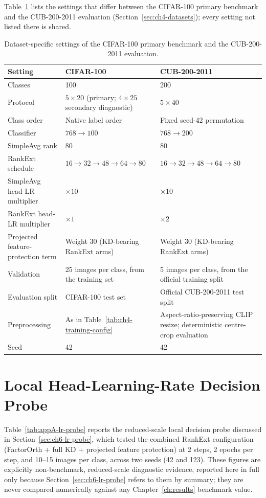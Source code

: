 Table~\ref{tab:appA-datasets} lists the settings that differ between the
CIFAR-100 primary benchmark and the CUB-200-2011 evaluation
(Section~\ref{sec:ch4-datasets}); every setting not listed there is shared.

\begin{table}[htbp]
\centering
\begin{tabularx}{\textwidth}{@{}l X X@{}}
\toprule
\textbf{Setting} & \textbf{CIFAR-100} & \textbf{CUB-200-2011} \\
\midrule
Classes & 100 & 200 \\
Protocol & $5\times20$ (primary; $4\times25$ secondary diagnostic) & $5\times40$ \\
Class order & Native label order & Fixed seed-42 permutation \\
Classifier & $768\to100$ & $768\to200$ \\
SimpleAvg rank & 80 & 80 \\
RankExt schedule & $16{\to}32{\to}48{\to}64{\to}80$ & $16{\to}32{\to}48{\to}64{\to}80$ \\
SimpleAvg head-LR multiplier & $\times10$ & $\times10$ \\
RankExt head-LR multiplier & $\times1$ & $\times2$ \\
Projected feature-protection term & Weight 30 (KD-bearing RankExt arms) & Weight 30 (KD-bearing RankExt arms) \\
Validation & 25 images per class, from the training set & 5 images per class, from the official training split \\
Evaluation split & CIFAR-100 test set & Official CUB-200-2011 test split \\
Preprocessing & As in Table~\ref{tab:ch4-training-config} & Aspect-ratio-preserving CLIP resize; deterministic centre-crop evaluation \\
Seed & 42 & 42 \\
\bottomrule
\end{tabularx}
\caption[Dataset-specific settings]{Dataset-specific settings of the
CIFAR-100 primary benchmark and the CUB-200-2011 evaluation.}
\label{tab:appA-datasets}
\end{table}

\section{Local Head-Learning-Rate Decision Probe}
\label{sec:appA-lr-probe}

Table~\ref{tab:appA-lr-probe} reports the reduced-scale local decision
probe discussed in Section~\ref{sec:ch6-lr-probe}, which tested the
combined RankExt configuration (FactorOrth + full KD + projected feature
protection) at
2 steps, 2 epochs per step, and 10--15 images per class, across two seeds
(42 and 123). These figures are explicitly non-benchmark, reduced-scale
diagnostic evidence, reported here in full only because
Section~\ref{sec:ch6-lr-probe} refers to them by summary; they are never
compared numerically against any Chapter~\ref{ch:results} benchmark value.

